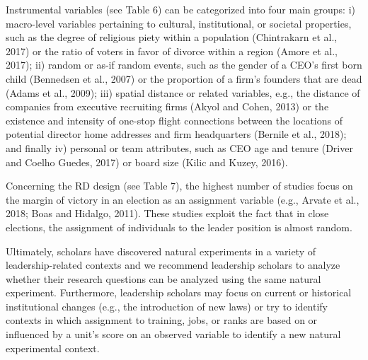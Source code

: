 \documentclass[english]{article}
\begin{document}
Instrumental variables (see Table 6) can be categorized into four main
groups: i) macro-level variables pertaining to cultural, institutional,
or societal properties, such as the degree of religious piety within a
population (Chintrakarn et al., 2017) or the ratio of voters in favor of
divorce within a region (Amore et al., 2017); ii) random or as-if random
events, such as the gender of a CEO's first born child (Bennedsen et
al., 2007) or the proportion of a firm's founders that are dead (Adams
et al., 2009); iii) spatial distance or related variables, e.g., the
distance of companies from executive recruiting firms (Akyol and Cohen,
2013) or the existence and intensity of one-stop flight connections
between the locations of potential director home addresses and firm
headquarters (Bernile et al., 2018); and finally iv) personal or team
attributes, such as CEO age and tenure (Driver and Coelho Guedes, 2017)
or board size (Kilic and Kuzey, 2016).

Concerning the RD design (see Table 7), the highest number of studies
focus on the margin of victory in an election as an assignment variable
(e.g., Arvate et al., 2018; Boas and Hidalgo, 2011). These studies
exploit the fact that in close elections, the assignment of individuals
to the leader position is almost random.

Ultimately, scholars have discovered natural experiments in a variety of
leadership-related contexts and we recommend leadership scholars to
analyze whether their research questions can be analyzed using the same
natural experiment. Furthermore, leadership scholars may focus on
current or historical institutional changes (e.g., the introduction of
new laws) or try to identify contexts in which assignment to training,
jobs, or ranks are based on or influenced by a unit's score on an
observed variable to identify a new natural experimental context.
\end{document}

